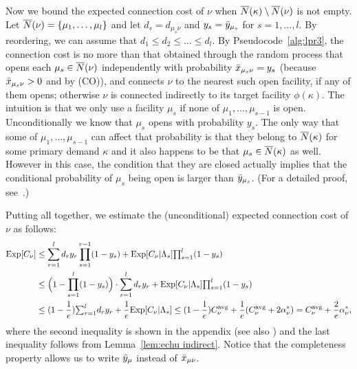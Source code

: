 Now we bound the expected connection cost of $\nu$ when
${\overline{N}}(\kappa)\setminus {\overline{N}}(\nu)$ is not empty.
Let ${\overline{N}}(\nu) = { \left\{ \mu_1,\ldots,\mu_l \right\} }$ and let $d_s
= d_{\mu_s\nu}$ and $y_s = {\bar y}_{\mu_s}$
for $s = 1,\ldots,l$. By reordering, we can
assume that $d_1 \le d_2 \le \ldots \le d_l$. 
By Pseudocode~\ref{alg:lpr3}, the connection cost is
no more than that obtained through the random process that
opens each $\mu_s\in {\overline{N}}(\nu)$ independently with
probability ${\bar x}_{\mu_s \nu} = y_{s}$ (because
${\bar x}_{\mu_s \nu} > 0$ and by (CO)), and connects $\nu$ to the
nearest such open facility, if any of them opens; otherwise
$\nu$ is connected indirectly to its target facility
$\phi(\kappa)$. The intuition is that we only use a facility
$\mu_s$ if none of $\mu_1,\ldots,\mu_{s-1}$ is
open. Unconditionally we know that $\mu_s$ opens with
probability $y_{s}$. The only way that some of
$\mu_1,\ldots,\mu_{s-1}$ can affect that probability is that
they belong to ${\overline{N}}(\kappa)$ for some primary demand
$\kappa$ and it also happens to be that $\mu_s \in
{\overline{N}}(\kappa)$ as well. However in this case, the condition
that they are closed actually implies that the conditional
probability of $\mu_s$ being open is larger than
${\bar y}_{\mu_s}$. (For a detailed proof,
see~\cite{ChudakS04}.)

Putting all together, we estimate the (unconditional) expected 
connection cost of $\nu$ as follows:
%
\begin{align*}
  \mbox{\rm Exp}[C_\nu] &\leq 
	\sum_{r=1}^l d_ry_r\prod_{s=1}^{r-1}(1-y_s)
		+  \mbox{\rm Exp}[C_\nu |\Lambda_s]\textstyle{\prod_{s=1}^{l}} (1-y_{s})
		\\
  &\leq \Big(1 - \prod_{s=1}^l (1-y_s)\Big) \cdot \sum_{r=1}^l d_r y_r
	+  \mbox{\rm Exp}[ C_\nu |\Lambda_s ]\textstyle{\prod_{s=1}^{l}} (1-y_{s})
	\\
  &\leq (1-\frac{1}{e}) {\textstyle\sum_{r=1}^l} d_ry_r 
	+ \frac{1}{e} \mbox{\rm Exp}[ C_\nu |\Lambda_s ] \leq (1-\frac{1}{e}) C^{{\mbox{\scriptsize\rm avg}}}_{\nu} 
	+	\frac{1}{e}	(C^{{\mbox{\scriptsize\rm avg}}}_{\nu} + 2\alpha_{\nu}^\ast) = C^{{\mbox{\scriptsize\rm avg}}}_{\nu} + \frac{2}{e}\alpha_{\nu}^\ast,
\end{align*}
%
where the second inequality is shown in the appendix
(see also \cite{ChudakS04}) and the last inequality follows from
Lemma~\ref{lem:echu indirect}. Notice that the
completeness property  allows us to write
${\bar y}_{\mu}$ instead of ${\bar x}_{\mu\nu}$.

